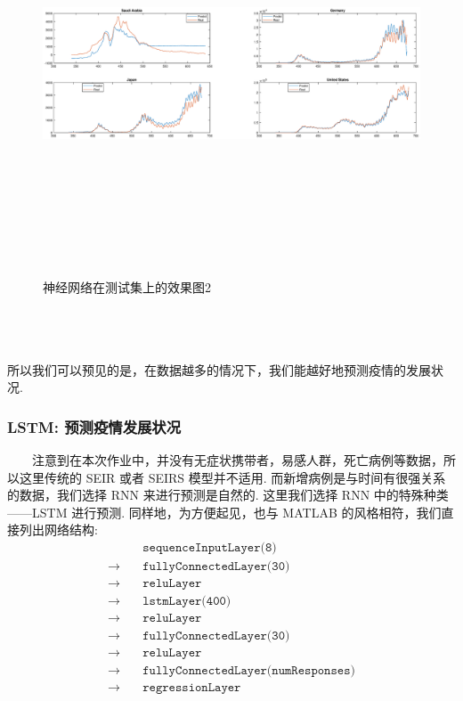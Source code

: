 \documentclass[a4paper, titlepage]{article}
\begin{document}
    \begin{minipage}{\textwidth}
        \begin{figure}[H]
            \centering
	        \includegraphics[height=12cm, width=14cm]{./images/Chapter5/Pred3.eps}
            \vspace{-4cm}
            \caption{神经网络在测试集上的效果图2}
        \end{figure}
    \end{minipage}\\\quad\\
    \quad\\
	所以我们可以预见的是，在数据越多的情况下，我们能越好地预测疫情的发展状况.

	\subsubsection{LSTM: 预测疫情发展状况}
    　　注意到在本次作业中，并没有无症状携带者，易感人群，死亡病例等数据，所以这里传统的 SEIR 或者 SEIRS 模型并不适用. 而新增病例是与时间有很强关系的数据，我们选择 RNN 来进行预测是自然的. 这里我们选择 RNN 中的特殊种类——LSTM 进行预测. 同样地，为方便起见，也与 MATLAB 的风格相符，我们直接列出网络结构:
	\begin{align*}
		&\texttt{sequenceInputLayer(8)} \\
        \rightarrow\quad&\texttt{fullyConnectedLayer(30)}\\
    	\rightarrow\quad&\texttt{reluLayer}\\
    	\rightarrow\quad&\texttt{lstmLayer(400)}\\
    	\rightarrow\quad&\texttt{reluLayer}\\
    	\rightarrow\quad&\texttt{fullyConnectedLayer(30)}\\
    	\rightarrow\quad&\texttt{reluLayer}\\
    	\rightarrow\quad&\texttt{fullyConnectedLayer(numResponses)}\\
    	\rightarrow\quad&\texttt{regressionLayer}
	\end{align*}
\end{document}
